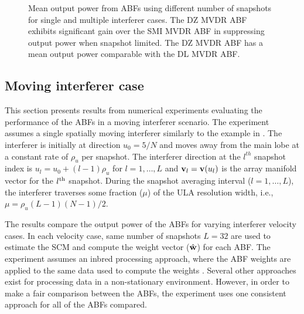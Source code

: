 \begin{figure*}[!hp]
\centering
{}
\hfil
{}
\caption[Mean output power from ABFs using different number of
snapshots for single and multiple interferer cases.]{Mean output power
  from ABFs using different number of snapshots for single and
  multiple interferer cases. The DZ MVDR ABF exhibits significant gain
  over the SMI MVDR ABF in suppressing output power when snapshot
  limited. The DZ MVDR ABF has a mean output power comparable with the
  DL MVDR ABF.}
\label{fig:pout-snapshot}
\end{figure*}


\subsection{Moving interferer case} 
\label{sec:moving-interferer}
This section presents results from numerical experiments evaluating
the performance of the ABFs in a moving interferer scenario. The
experiment assumes a single spatially moving
interferer similarly to the
example in \cite[Sec. 4]{cox2000mrabf}. The interferer is initially at
direction $u_0 = 5/N$ and moves away from the main lobe at a constant
rate of $\rho_u$ per snapshot. The interferer direction at the
$l^{th}$ snapshot index is $u_l = u_0 + (l-1) \rho_u $ for
$l = 1, \ldots, L$ and ${\bf v}_l = {\bf v}(u_l)$ is the array manifold
vector for the $l^{\rm th}$ snapshot. During the snapshot averaging
interval ($l = 1,\ldots, L$), the interferer traverses some fraction
($\mu$) of the ULA resolution width, i.e.,
$\mu = \rho_u (L-1)(N - 1)/2$.

The results compare the output power of the ABFs for
varying interferer velocity cases. In each velocity case, same
number of snapshots $L = 32$ are used to estimate the SCM and compute
the weight vector ($\hat{{\bf w}}$) for each ABF. The experiment assumes an
inbred processing approach, where the ABF weights are applied to the
same data used to compute the weights \cite{cox2002adaptive}. Several
other approaches exist for processing data in a non-stationary
environment. However, in order to make a fair comparison between the
ABFs, the experiment uses one consistent approach for all of the ABFs
compared.

